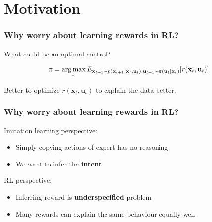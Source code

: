 \section{Motivation} %

\begin{frame}
    \frametitle{Why worry about learning rewards in RL?}

    What could be an optimal control?

    \begin{align}
        \pi = \operatorname*{arg\,max}_{\pi} E_{\mathbf{x}_{t+1} \thicksim p(\mathbf{x}_{t+1} | \mathbf{x}_{t}, \mathbf{u}_t), \mathbf{u}_{t+1} \thicksim \pi(\mathbf{u}_{t} | \mathbf{x}_{t})}[r(\mathbf{x}_t, \mathbf{u}_t)]
    \end{align}

    Better to optimize $r(\mathbf{x}_t, \mathbf{u}_t)$ to explain the data better.
\end{frame}

\begin{frame}
    \frametitle{Why worry about learning rewards in RL?}

    Imitation learning perspective:

    \begin{itemize}
        \item Simply copying actions of expert has no reasoning
        \item We want to infer the \textbf{intent}
    \end{itemize}

    RL perspective:

    \begin{itemize}
        \item Inferring reward is \textbf{underspecified} problem
        \item Many rewards can explain the same behaviour equally-well
    \end{itemize}
\end{frame}
